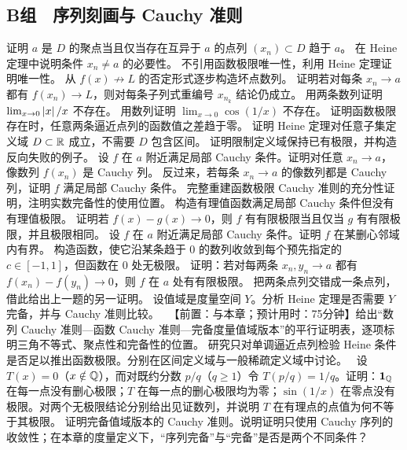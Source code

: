 \subsection*{B组　序列刻画与 Cauchy 准则}

\begin{enumerate}[label=\textbf{\thechapter.\arabic*.},ref=\thechapter.\arabic*,leftmargin=3.4em,labelsep=0.7em,itemsep=0.85em,topsep=0.8em,resume]

  证明 \(a\) 是 \(D\) 的聚点当且仅当存在互异于 \(a\) 的点列 \((x_n)\subset D\) 趋于 \(a\)。
   在 Heine 定理中说明条件 \(x_n\ne a\) 的必要性。
   不引用函数极限唯一性，利用 Heine 定理证明唯一性。
   从 \(f(x)\not\to L\) 的否定形式逐步构造坏点数列。
   证明若对每条 \(x_n\to a\) 都有 \(f(x_n)\to L\)，则对每条子列式重编号 \(x_{n_k}\) 结论仍成立。
   用两条数列证明 \(\lim_{x\to0}\left|x\right|/x\) 不存在。
   用数列证明 \(\lim_{x\to0}\cos(1/x)\) 不存在。
   证明函数极限存在时，任意两条逼近点列的函数值之差趋于零。
  证明 Heine 定理对任意子集定义域 \(D\subset\mathbb{R}\) 成立，不需要 \(D\) 包含区间。
   证明限制定义域保持已有极限，并构造反向失败的例子。
   设 \(f\) 在 \(a\) 附近满足局部 Cauchy 条件。证明对任意 \(x_n\to a\)，像数列 \(f(x_n)\) 是 Cauchy 列。
   反过来，若每条 \(x_n\to a\) 的像数列都是 Cauchy 列，证明 \(f\) 满足局部 Cauchy 条件。
   完整重建函数极限 Cauchy 准则的充分性证明，注明实数完备性的使用位置。
   构造有理值函数满足局部 Cauchy 条件但没有有理值极限。
   证明若 \(f(x)-g(x)\to0\)，则 \(f\) 有有限极限当且仅当 \(g\) 有有限极限，并且极限相同。
   设 \(f\) 在 \(a\) 附近满足局部 Cauchy 条件。证明 \(f\) 在某删心邻域内有界。
  构造函数，使它沿某条趋于 \(0\) 的数列收敛到每个预先指定的 \(c\in[-1,1]\)，但函数在 \(0\) 处无极限。
   证明：若对每两条 \(x_n,y_n\to a\) 都有 \(f(x_n)-f(y_n)\to0\)，则 \(f\) 在 \(a\) 处有有限极限。
   把两条点列交错成一条点列，借此给出上一题的另一证明。
   设值域是度量空间 \(Y\)。分析 Heine 定理是否需要 \(Y\) 完备，并与 Cauchy 准则比较。
  \ 【前置：与本章；预计用时：75分钟】给出“数列 Cauchy 准则—函数 Cauchy 准则—完备度量值域版本”的平行证明表，逐项标明三角不等式、聚点性和完备性的位置。
   研究只对单调逼近点列检验 Heine 条件是否足以推出函数极限。分别在区间定义域与一般稀疏定义域中讨论。
  \ 设 \(T(x)=0\)（\(x\notin\mathbb{Q}\)），而对既约分数 \(p/q\)（\(q\ge1\)）令 \(T(p/q)=1/q\)。证明：\(\mathbf1_{\mathbb{Q}}\) 在每一点没有删心极限；\(T\) 在每一点的删心极限均为零；\(\sin(1/x)\) 在零点没有极限。对两个无极限结论分别给出见证数列，并说明 \(T\) 在有理点的点值为何不等于其极限。
   证明完备值域版本的 Cauchy 准则。说明证明只使用 Cauchy 序列的收敛性；在本章的度量定义下，“序列完备”与“完备”是否是两个不同条件？

\end{enumerate}

